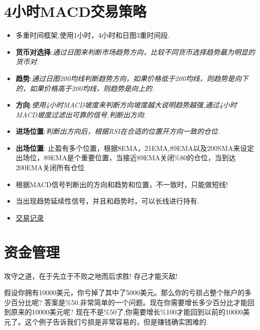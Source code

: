 \section{4小时MACD交易策略}


%


\begin{itemize}
\item 多重时间框架,使用1小时，4小时和日图3重时间段.
\item \textbf{货币对选择}:\textit{通过日图来判断市场趋势方向，比较不同货币选择趋势最为明显的货币对.}
\item \textbf{趋势}:\textit{通过日图200均线判断趋势方向，如果价格低于200均线，则趋势是向下的，如果价格高于200均线，则趋势是向上的.}
\item \textbf{方向}:\textit{使用4小时MACD坡度来判断方向坡度越大说明趋势越强,通过4小时MACD坡度过滤出可靠的信号,判断出方向.}
\item \textbf{进场位置}:\textit{判断出方向后，根据RSI在合适的位置开方向一致的仓位.}
\item \textbf{出场位置}: 止盈有多个位置，根据8EMA，21EMA,89EMA以及200SMA来设定出场位，89EMA是个重要位置，当接近89EMA关闭\%80的仓位，当到达200EMA关闭所有仓位
\item 根据MACD信号判断出的方向和趋势和位置，不一致时，只能做短线!
\item 当出现趋势延续性信号，并且和趋势时，可以长线进行持有.
\item \href{run:4Hour MACD deals.xlsm}{交易记录} 
\end{itemize}

\section{资金管理}

攻守之道，在于先立于不败之地而后求胜! 存己才能灭敌!

假设你拥有10000美元，你亏掉了其中了5000美元。那么你的亏损占整个账户的多少百分比呢?
答案是\%50.非常简单的一个问题。现在你需要增长多少百分比才能回到原来的10000美元呢?
现在不是\%50了,你需要增长\%100才能回到以前的10000美元了。这个例子告诉我们亏损是非常容易的，但是赚钱确实困难的.

